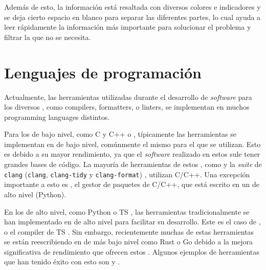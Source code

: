 Además de esto, la información está resaltada con diversos colores e indicadores
y se deja cierto espacio en blanco para separar las diferentes partes, lo cual
ayuda a leer rápidamente la información más importante para solucionar el
problema y filtrar la que no se necesita.


\FloatBarrier

\section{Lenguajes de programación}\label{sec:programming-languages}

Actualmente, las herramientas utilizadas durante el desarrollo de
\textit{software} para los diversos ,
como \glspl{compiler}, \glspl{formatter}, o \glspl{linter}, se implementan en
muchos \glspl{programming language} distintos.

Para los  de bajo nivel, como C
\parencite{C} y C++ \parencite{cpp} o ,
típicamente las herramientas se implementan en  de bajo nivel, comúnmente el mismo para el que se utilizan.
Esto es debido a su mayor rendimiento, ya que el \textit{software} realizado en
estos  sule tener grandes bases de
código. La mayoría de herramientas de estos , como  y la \textit{suite} de \verb!clang!
(\verb!clang!, \verb!clang-tidy! y \verb!clang-format!) \parencite{clang},
utilizan C/C++. Una excepción importante a esto es , el gestor de
paquetes de C/C++, que está escrito en un 
de alto nivel (Python).

En los  de alto nivel, como Python
\parencite{Python} o \gls{TS} \parencite{typescript}, las herramientas
tradicionalmente se han implementado en  de alto nivel para facilitar su desarrollo. Este es el caso
de ,  o el \gls{compiler} de \gls{TS}
\parencite{tsc}. Sin embargo, recientemente muchas de estas herramientas se
están reescribiendo en  de más bajo
nivel como Rust \parencite{Rust} o Go \parencite{Go} debido a la mejora
significativa de rendimiento que ofrecen estos  \parencite{typescript-go}. Algunos ejemplos de herramientas
que han tenido éxito con esto son  y .
